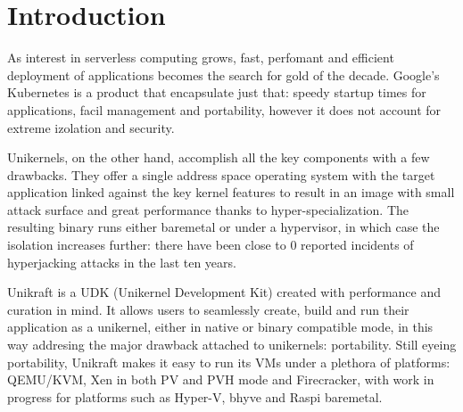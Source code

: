 \chapter{Introduction}
\label{chapter:intro}

As interest in serverless computing grows, fast, perfomant and efficient deployment of applications becomes the search for gold of the decade.
Google's Kubernetes is a product that encapsulate just that: speedy startup times for applications, facil management and portability, however it does not account for extreme izolation and security.

Unikernels, on the other hand, accomplish all the key components with a few drawbacks.
They offer a single address space operating system with the target application linked against the key kernel features to result in an image with small attack surface and great performance thanks to hyper-specialization.
The resulting binary runs either baremetal or under a hypervisor, in which case the isolation increases further: there have been close to 0 reported incidents of hyperjacking attacks in the last ten years.

Unikraft is a UDK (Unikernel Development Kit) created with performance and curation in mind.
It allows users to seamlessly create, build and run their application as a unikernel, either in native or binary compatible mode, in this way addresing the major drawback attached to unikernels: portability.
Still eyeing portability, Unikraft makes it easy to run its VMs under a plethora of platforms: QEMU/KVM, Xen in both PV and PVH mode and Firecracker, with work in progress for platforms such as Hyper-V, bhyve and Raspi baremetal.

